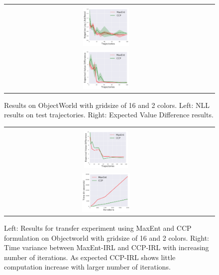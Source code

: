 \documentclass{article}
\def\MSHangBox#1{%
\begin{minipage}[t]{\textwidth}%
\begin{tabbing} %
~\\[-\baselineskip] %
#1 %
\end{tabbing}%
\end{minipage}} %
\begin{document}
\begin{figure}[t]
\centering
  \begin{tabular}{cc}
    \MSHangBox{\includegraphics[width=0.23\textwidth]{images/objectworld/grid_16_object_8/test_ll.pdf}}
    \MSHangBox{\includegraphics[width=0.23\textwidth]{images/objectworld/grid_16_object_8/evd_maxent_vs_ccp.pdf}}
  \end{tabular}
    \caption{Results on ObjectWorld with gridsize of 16 and 2 colors. Left: NLL results on test trajectories. Right: Expected Value Difference results. }
    \label{fig:img_objectworld_maxent_vs_ccp_lr_01}
\end{figure}

\begin{figure}[t]
\centering
  \begin{tabular}{cc}
    \MSHangBox{\includegraphics[width=0.22\textwidth]{images/objectworld/transfer/ccp_no_var_maxent_no_var.pdf}}
    \MSHangBox{\includegraphics[width=0.24\textwidth]{images/objectworld/timeit_maxent_vs_ccp_grid_16_per_iter.pdf}}
  \end{tabular}
    \caption{Left: Results for transfer experiment using MaxEnt and CCP formulation on Objectworld with gridsize of 16 and 2 colors. Right: Time variance between MaxEnt-IRL and CCP-IRL with increasing number of iterations. As expected CCP-IRL shows little computation increase with larger number of iterations.}
    \label{fig:img_objectworld_maxent_vs_ccp_time_results}
\end{figure}
\end{document}
